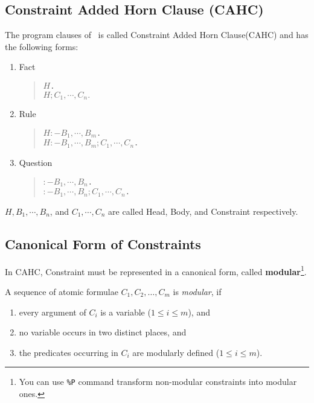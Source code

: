 \subsection{Constraint Added Horn Clause (CAHC)}
The program clauses of \cuprolog\ is called
 Constraint Added Horn Clause(CAHC) and has the following forms:
\begin{enumerate}
\item Fact 
\begin{quote}
	{\tt $H$.}\\
	{\tt $H; C_{1},\cdots, C_{n}.$}
\end{quote}
\item Rule
\begin{quote}
	{\tt $H :-B_{1},\cdots, B_{m}$.} \\
	{\tt $H:-B_{1},\cdots, B_{m}; C_{1},\cdots, C_{n}$.}
\end{quote}
\item Question
\begin{quote}
	{\tt $:-B_{1},\cdots, B_{n}$.} \\
	{\tt $:-B_{1},\cdots, B_{n}; C_{1},\cdots, C_{n}$.}
\end{quote}

\end{enumerate}
{\tt $H,B_{1},\cdots, B_{n}$}, and {\tt $C_{1},\cdots, C_{n}$} are 
called Head, Body, and Constraint respectively.
\normalskip

\subsection{Canonical Form of Constraints}

 In CAHC, Constraint must be represented in a canonical form, called {\bf
modular}\footnote{You can use {\tt \%P} command transform non-modular
constraints into modular ones.}.

\begin{defs}[modular]
A sequence of atomic formulae $C_{1},C_{2},\ldots,C_{m}$ is {\em modular},
if
\begin{enumerate}
 \item every argument of $C_{i}$ is a variable ($1 \leq i \leq m$), and
 \item no variable occurs in two distinct places, and 
 \item the predicates occurring in $C_{i}$ are modularly defined 
($1 \leq i \leq m$).
\end{enumerate}
\end{defs}

